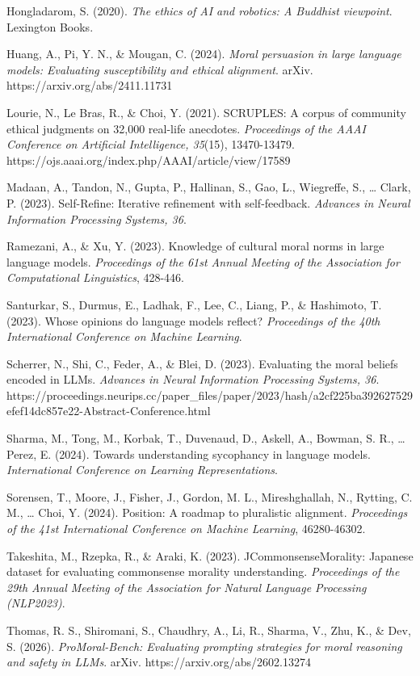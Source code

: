 \documentclass[
  11pt,
]{article}
\begin{document}
Hongladarom, S. (2020). \emph{The ethics of AI and robotics: A Buddhist
viewpoint}. Lexington Books.

Huang, A., Pi, Y. N., \& Mougan, C. (2024). \emph{Moral persuasion in
large language models: Evaluating susceptibility and ethical alignment}.
arXiv. https://arxiv.org/abs/2411.11731

Lourie, N., Le Bras, R., \& Choi, Y. (2021). SCRUPLES: A corpus of
community ethical judgments on 32,000 real-life anecdotes.
\emph{Proceedings of the AAAI Conference on Artificial Intelligence,
35}(15), 13470-13479.
https://ojs.aaai.org/index.php/AAAI/article/view/17589

Madaan, A., Tandon, N., Gupta, P., Hallinan, S., Gao, L., Wiegreffe, S.,
\ldots{} Clark, P. (2023). Self-Refine: Iterative refinement with
self-feedback. \emph{Advances in Neural Information Processing Systems,
36}.

Ramezani, A., \& Xu, Y. (2023). Knowledge of cultural moral norms in
large language models. \emph{Proceedings of the 61st Annual Meeting of
the Association for Computational Linguistics}, 428-446.

Santurkar, S., Durmus, E., Ladhak, F., Lee, C., Liang, P., \& Hashimoto,
T. (2023). Whose opinions do language models reflect? \emph{Proceedings
of the 40th International Conference on Machine Learning}.

Scherrer, N., Shi, C., Feder, A., \& Blei, D. (2023). Evaluating the
moral beliefs encoded in LLMs. \emph{Advances in Neural Information
Processing Systems, 36}.
https://proceedings.neurips.cc/paper\_files/paper/2023/hash/a2cf225ba392627529efef14dc857e22-Abstract-Conference.html

Sharma, M., Tong, M., Korbak, T., Duvenaud, D., Askell, A., Bowman, S.
R., \ldots{} Perez, E. (2024). Towards understanding sycophancy in
language models. \emph{International Conference on Learning
Representations}.

Sorensen, T., Moore, J., Fisher, J., Gordon, M. L., Mireshghallah, N.,
Rytting, C. M., \ldots{} Choi, Y. (2024). Position: A roadmap to
pluralistic alignment. \emph{Proceedings of the 41st International
Conference on Machine Learning}, 46280-46302.

Takeshita, M., Rzepka, R., \& Araki, K. (2023). JCommonsenseMorality:
Japanese dataset for evaluating commonsense morality understanding.
\emph{Proceedings of the 29th Annual Meeting of the Association for
Natural Language Processing (NLP2023)}.

Thomas, R. S., Shiromani, S., Chaudhry, A., Li, R., Sharma, V., Zhu, K.,
\& Dev, S. (2026). \emph{ProMoral-Bench: Evaluating prompting strategies
for moral reasoning and safety in LLMs}. arXiv.
https://arxiv.org/abs/2602.13274
\end{document}
